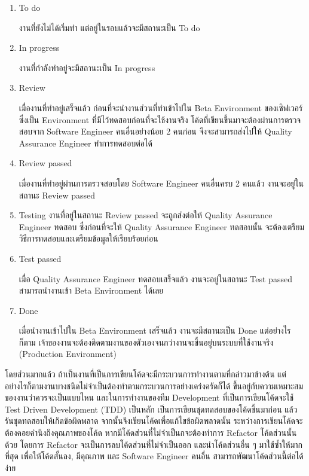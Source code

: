 \begin{enumerate}
	\item To do
	
	งานที่ยังไม่ได้เริ่มทำ แต่อยู่ในรอบแล้วจะมีสถานะเป็น To do
	
	\item In progress
	
	งานที่กำลังทำอยู่จะมีสถานะเป็น In progress
	
	\item Review
	
	เมื่องานที่ทำอยู่เสร็จแล้ว ก่อนที่จะนำงานส่วนที่ทำเข้าไปใน Beta Environment ของเซิฟเวอร์ ซึ่งเป็น Environment ที่มีไว้ทดสอบก่อนที่จะใช้งานจริง โค้ดที่เขียนขึ้นมาจะต้องผ่านการตรวจสอบจาก Software Engineer คนอื่นอย่างน้อย 2 คนก่อน จึงจะสามารถส่งไปให้ Quality Assurance Engineer ทำการทดสอบต่อได้
	
	\item Review passed
	
	เมื่องานที่ทำอยู่ผ่านการตรวจสอบโดย Software Engineer คนอื่นครบ 2 คนแล้ว งานจะอยู่ในสถานะ Review passed 
	
	\item Testing
	งานที่อยู่ในสถานะ Review passed จะถูกส่งต่อให้ Quality Assurance Engineer ทดสอบ ซึ่งก่อนที่จะให้ Quality Assurance Engineer ทดสอบนั้น จะต้องเตรียมวิธีการทดสอบและเตรียมข้อมูลให้เรียบร้อยก่อน
	
	\item Test passed
	
	เมื่อ Quality Assurance Engineer ทดสอบเสร็จแล้ว งานจะอยู่ในสถานะ Test passed สามารถนำงานเข้า Beta Environment ได้เลย
	
	\item Done
	
	เมื่อนำงานเข้าไปใน Beta Environment เสร็จแล้ว งานจะมีสถานะเป็น Done แต่อย่างไรก็ตาม เจ้าของงานจะต้องติดตามงานของตัวเองจนกว่างานจะขึ้นอยู่บนระบบที่ใช้งานจริง (Production Environment)
\end{enumerate}

โดยส่วนมากแล้ว ถ้าเป็นงานที่เป็นการเขียนโค้ดจะมีกระบวนการทำงานตามที่กล่าวมาข้างต้น แต่อย่างไรก็ตามงานบางชนิดไม่จำเป็นต้องทำตามกระบวนการอย่างเคร่งครัดก็ได้ ขึ้นอยู่กับความเหมาะสมของงานว่าควรจะเป็นแบบไหน และในการทำงานของทีม Development ที่เป็นการเขียนโค้ดจะใช้ Test Driven Development (TDD) เป็นหลัก เป็นการเขียนชุดทดสอบของโค้ดขึ้นมาก่อน แล้วรันชุดทดสอบให้เกิดข้อผิดพลาด จากนั้นจึงเขียนโค้ดเพื่อแก้ไขข้อผิดพลาดนั้น ระหว่างการเขียนโค้ดจะต้องคอยคำนึงถึงคุณภาพของโค้ด หากมีโค้ดส่วนที่ไม่จำเป็นกจะต้องทำการ Refactor โค้ดส่วนนั้นด้วย โดยการ Refactor จะเป็นการลบโค้ดส่วนที่ไม่จำเป็นออก และนำโค้ดส่วนอื่น ๆ มาใช้ซ้ำให้มากที่สุด เพื่อให้โค้ดสั้นลง, มีคุณภาพ และ Software Engineer คนอื่น สามารถพัฒนาโค้ดส่วนนี้ต่อได้ง่าย

